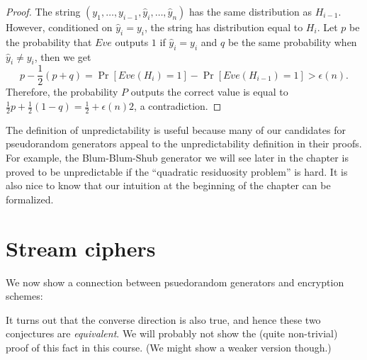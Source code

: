 \begin{proof}
The string \((y_1,\ldots,y_{i-1}, \hat y_i,\ldots,\hat y_n)\) has the
same distribution as \(H_{i-1}\). However, conditioned on
\(\hat y_i=y_i\), the string has distribution equal to \(H_{i}\). Let
\(p\) be the probability that \(Eve\) outputs \(1\) if \(\hat y_i=y_i\)
and \(q\) be the same probability when \(\hat y_i\neq y_i\), then we get
\begin{equation*}
p-\frac12(p+q)=\Pr[Eve(H_{i})=1]-\Pr[Eve(H_{i-1})=1]>\epsilon(n).
\end{equation*}
Therefore, the probability \(P\) outputs the correct value is equal to
\(\frac12p+\frac12(1-q)=\frac12+\epsilon(n)2\), a contradiction.

\end{proof}

The definition of unpredictability is useful because many of our
candidates for pseudorandom generators appeal to the unpredictability
definition in their proofs. For example, the Blum-Blum-Shub generator we
will see later in the chapter is proved to be unpredictable if the
``quadratic residuosity problem'' is hard. It is also nice to know that
our intuition at the beginning of the chapter can be formalized.

\section{Stream ciphers}\label{3-Stream-ciphers}

We now show a connection between psuedorandom generators and encryption
schemes:

\hypertarget{PRGandcipherthm}{}

It turns out that the converse direction is also true, and hence these
two conjectures are \emph{equivalent}. We will probably not show the
(quite non-trivial) proof of this fact in this course. (We might show a
weaker version though.)

